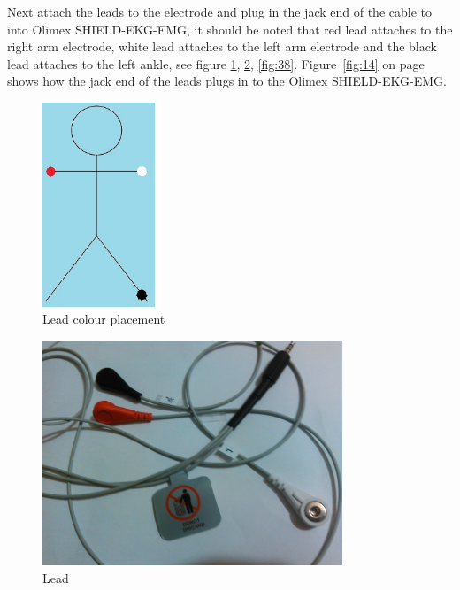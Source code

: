 \documentclass[12pt,]{article}
\numberwithin{figure}{section}
\begin{document}
Next attach the leads to the electrode and plug in the jack end of the cable to into Olimex SHIELD-EKG-EMG, it should be noted that red lead attaches to the right arm electrode, white lead attaches to the left arm electrode and the black lead attaches to the left ankle, see figure \ref{fig:25}, \ref{fig:37}, \ref{fig:38}. Figure~\ref{fig:14} on page~\pageref{fig:14} shows how the jack end of the leads plugs in to the Olimex SHIELD-EKG-EMG.
\begin{figure}[H]
	\begin{center}
		\includegraphics[width=0.3\textwidth]{23}
	\end{center}
    \caption{Lead colour placement}
	\label{fig:25}
\end{figure}
\begin{figure}[H]
	\begin{center}
		\includegraphics[width=0.8\textwidth]{24}
	\end{center}
    \caption{Lead}
	\label{fig:37}
\end{figure}
\end{document}

